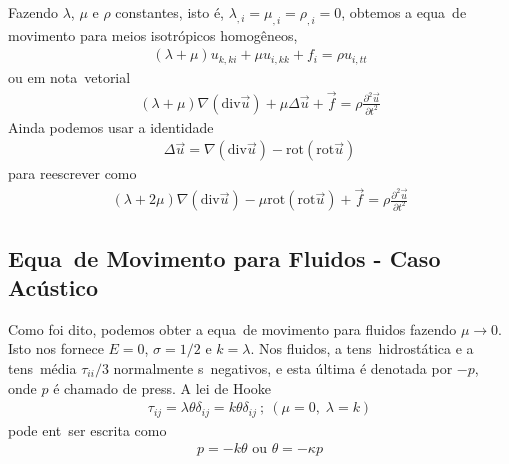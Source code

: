 Fazendo $\lambda$, $\mu$ e $\rho$ constantes, isto \'e,
$\lambda_{,i}=\mu_{,i}=\rho_{,i}=0$, obtemos a equa\cao\ de movimento
para meios isotr\'opicos homog\^eneos,
\begin{eqnarray}
(\lambda + \mu)u_{k,ki} + \mu u_{i,kk} + f_i = \rho u_{i,tt}
\end{eqnarray}
ou em nota\cao\ vetorial
\begin{eqnarray}
(\lambda + \mu)\nabla(\mbox{div}\vec{u}) + \mu\Delta\vec{u} + \vec{f} = \rho\frac{\partial^2\vec{u}}{\partial t^2}
\end{eqnarray}
Ainda podemos usar a identidade
\begin{eqnarray}
\Delta\vec{u} = \nabla(\mbox{div}\vec{u}) - \mbox{rot}(\mbox{rot}\vec{u})
\end{eqnarray}
para reescrever como
\begin{eqnarray}
(\lambda + 2\mu)\nabla(\mbox{div}\vec{u}) - \mu\mbox{rot}(\mbox{rot}\vec{u}) + \vec{f} 
= \rho\frac{\partial^2\vec{u}}{\partial t^2}
\end{eqnarray}

\subsection{Equa\coes\ de Movimento para Fluidos - Caso Ac\'ustico}

Como foi dito, podemos obter a equa\cao\ de movimento
para fluidos fazendo $\mu \longrightarrow 0$. Isto nos
fornece $E = 0$, $\sigma = 1/2$ e $k = \lambda$. Nos fluidos, a tens\ao\
hidrost\'atica e a tens\ao\ m\'edia $\tau_{ii}/3$ normalmente s\ao\
negativos, e esta \'ultima \'e denotada por $-p$, onde $p$ \'e chamado
de press\ao. A lei de Hooke
\begin{eqnarray}
\tau_{ij} = \lambda\theta\delta_{ij} = k\theta\delta_{ij} \ ; \   (\mu = 0, \; \lambda = k)
\end{eqnarray}
pode ent\ao\ ser escrita como
\begin{eqnarray}
p = -k\theta \mbox{ ou } \theta = -\kappa p
\end{eqnarray}

